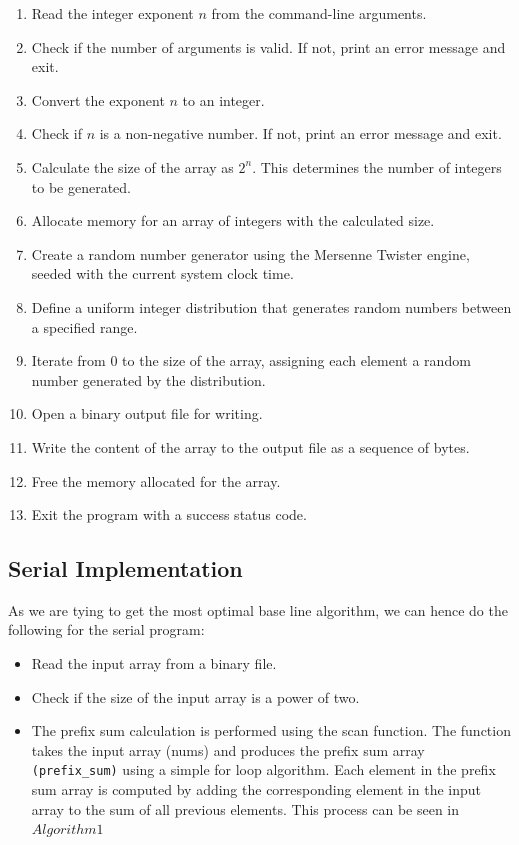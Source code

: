 \begin{enumerate}
    \item Read the integer exponent $n$ from the command-line arguments.
    \item Check if the number of arguments is valid. If not, print an error message and exit.
    \item Convert the exponent $n$ to an integer.
    \item Check if $n$ is a non-negative number. If not, print an error message and exit.
    \item Calculate the size of the array as $2^n$. This determines the number of integers to be generated.
    \item Allocate memory for an array of integers with the calculated size.
    \item Create a random number generator using the Mersenne Twister engine, seeded with the current system clock time.
    \item Define a uniform integer distribution that generates random numbers between a specified range.
    \item Iterate from 0 to the size of the array, assigning each element a random number generated by the distribution.
    \item Open a binary output file for writing.
    \item Write the content of the array to the output file as a sequence of bytes.
    \item Free the memory allocated for the array.
    \item Exit the program with a success status code.
\end{enumerate}

\subsection{Serial Implementation}
As we are tying to get the most optimal base line algorithm, we can hence do the following for the serial program:

\begin{itemize}
    \item Read the input array from a binary file.
    \item Check if the size of the input array is a power of two.
    \item The prefix sum calculation is performed using the scan function. The function takes the input array (nums) and produces the prefix sum array \lstinline|(prefix_sum)| using a simple for loop algorithm. Each element in the prefix sum array is computed by adding the corresponding element in the input array to the sum of all previous elements. This process can be seen in $Algorithm 1$
\end{itemize}

